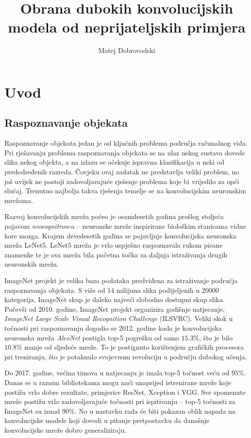 \documentclass[utf8, diplomski]{fer}
\begin{document}
\title{Obrana dubokih konvolucijskih modela od neprijateljskih primjera}
\author{Matej Dobrovodski}

\maketitle

\zahvala{}
\tableofcontents

\chapter{Uvod}
\section{Raspoznavanje objekata}
Raspoznavanje objekata jedan je od ključnih problema područja računalnog vida. Pri rješavanju problema raspoznavanja objekata se na ulaz nekog sustava dovede slika nekog objekta, a na izlazu se očekuje ispravna klasifikacija u neki od predodređenih razreda. Čovjeku ovaj zadatak ne predstavlja veliki problem, no još uvijek ne postoji zadovoljavajuće rješenje problema koje bi vrijedilo za opći slučaj. Trenutno najbolja takva rješenja temelje se na konvolucijskim neuronskim mrežama. \par
Razvoj konvolucijskih mreža počeo je osamdesetih godina prošlog stoljeća pojavom \textit{neocognitron}-a -- neuronske mreže inspirirane biološkim stanicama vidne kore mozga. Krajem devedesetih godina se pojavljuje konvolucijska neuronska mreža LeNet5. LeNet5 mreža je vrlo uspješno raspoznavala rukom pisane znamenke te je ova mreža bila početna točka za daljnja istraživanja drugih neuronskih mreža. \par
ImageNet\citep{ILSVRC15} projekt je velika baza podataka predviđena za istraživanje područja raspoznavanja objekata. S više od $14$ milijuna slika podijeljenih u $20000$ kategorija, ImageNet skup je daleko najveći slobodno dostupni skup slika. Počevši od 2010. godine, ImageNet projekt organizira godišnje natjecanje, \textit{ImageNet Large Scale Visual Recognition Challenge} (ILSVRC). Veliki skok u točnosti pri raspoznavanju dogodio se 2012. godine kada je konvolucijska neuronska mreža \textit{AlexNet}\citep{alexnet} postigla top-5 pogrešku od samo $15.3\%$, što je bilo $10.8\%$ manje od sljedeće mreže. To je postignuto korištenjem grafičkih procesora pri treniranju, što je potaknulo svojevrsnu revoluciju u području dubokog učenja. \par
Do 2017. godine, većina timova u natjecanju je imala top-5 točnost veću od $95\%$. Danas se u raznim bibliotekama mogu naći unaprijed istrenirane mreže koje postižu vrlo dobre rezultate, primjerice ResNet, Xception i VGG. Sve spomenute mreže postižu vrlo zadovoljavajuće točnosti pri ispitivanju -- top-5 točnosti za ImageNet su iznad $90\%$. No u nastavku rada će biti pokazan oblik napada na konvolucijske modele koji dovodi u pitanje pretpostavku da današnje konvolucijske mreže dobro generaliziraju.
\end{document}
